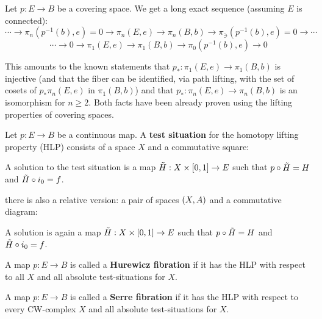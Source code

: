 \begin{example}
Let $p:E\to B$ be a covering space. We get a long exact sequence (assuming $E$ is connected):
\[\cdots\to\pi_n(p^{-1}(b),e)=0\to\pi_n(E,e)\to\pi_n(B,b)\to\pi_\ni(p^{-1}(b),e)=0\to\cdots\]
\[\cdots\to 0 \to\pi_1(E,e)\to\pi_1(B,b)\to\pi_0(p^{-1}(b),e)\to 0\]

This amounts to the known statements that $p_*:\pi_1(E,e)\to\pi_1(B,b)$ is injective (and that the fiber can be identified, via path lifting, with the set of cosets of $p_*\pi_n(E,e)$ in $\pi_1(B,b)$) and that $p_*:\pi_n(E,e)\to\pi_n(B,b)$ is an isomorphism for $n\geq 2$. Both facts have been already proven using the lifting properties of covering spaces.
\end{example}

Let $p:E\to B$ be a continuous map. A \textbf{test situation} for the homotopy lifting property (HLP) consists of a space $X$ and a commutative square:
\begin{center}
\end{center}

A solution to the test situation is a map $\tilde H:X\times[0,1]\to E$
 such that $p\circ\tilde H=H$ and $\tilde H\circ i_0=f$.
 
 there is also a relative version: a pair of spaces $(X,A)$ and a commutative diagram:
\begin{center}
\end{center}

A solution is again a map $\tilde H:X\times[0,1]\to E$ such that $p\circ\tilde H=H$ and $\tilde H\circ i_0=f$.

A map $p:E\to B$ is called a \textbf{Hurewicz fibration} if it has the HLP with respect to all $X$ and all absolute test-situations for $X$.

A map $p:E\to B$ is called a \textbf{Serre fibration} if it has the HLP with respect to every CW-complex $X$ and all absolute test-situations for $X$.

